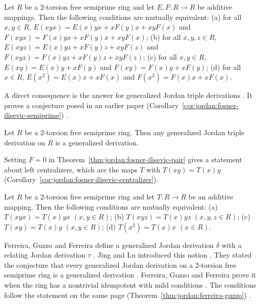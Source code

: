 \begin{theorem}\label{thm:jordan:fosner-ilisevic-pair}
Let $R$ be a $2$-torsion free semiprime ring and let $E,F\colon R\to R$ be additive mappings.
Then the following conditions are mutually equivalent:
(a) for all $x,y\in R$, $E(xyx)=E(x)yx+xF(y)x+xyF(x)$ and $F(xyx)=F(x)yx+xF(y)x+xyF(x)$;
(b) for all $x,y,z\in R$, $E(xyz)=E(x)yz+xF(y)z+xyF(z)$ and $F(xyz)=F(x)yz+xF(y)z+xyF(z)$;
(c) for all $x,y\in R$, $E(xy)=E(x)y+xF(y)$ and $F(xy)=F(x)y+xF(y)$;
(d) for all $x\in R$, $E(x^{2})=E(x)x+xF(x)$ and $F(x^{2})=F(x)x+xF(x)$.
\end{theorem}

A direct consequence is the answer for generalized Jordan triple derivations
\cite[p.~424]{FosnerIlisevic2008}. It proves a conjecture posed in an earlier paper (Corollary~\ref{cor:jordan:fosner-ilisevic-semiprime})
\cite[p.~424]{FosnerIlisevic2008}.\begin{corollary}\label{cor:jordan:fosner-ilisevic-semiprime}
Let $R$ be a $2$-torsion free semiprime ring. Then any generalized Jordan triple derivation on $R$
is a generalized derivation.
\end{corollary}

Setting $F=0$ in Theorem~\ref{thm:jordan:fosner-ilisevic-pair} gives a statement about left
centralizers, which are the maps $T$ with $T(xy)=T(x)y$ \cite[p.~424]{FosnerIlisevic2008} (Corollary~\ref{cor:jordan:fosner-ilisevic-centralizer}).

\begin{corollary}\label{cor:jordan:fosner-ilisevic-centralizer}
Let $R$ be a $2$-torsion free semiprime ring and let $T\colon R\to R$ be an additive mapping.
Then the following conditions are mutually equivalent:
(a) $T(xyx)=T(x)yx$ $(x,y\in R)$;
(b) $T(xyz)=T(x)yz$ $(x,y,z\in R)$;
(c) $T(xy)=T(x)y$ $(x,y\in R)$;
(d) $T(x^{2})=T(x)x$ $(x\in R)$.
\end{corollary}

Ferreira, Guzzo and Ferreira define a generalized Jordan derivation $\delta$ with a relating
Jordan derivation $\tau$ \cite[p.~1]{FerreiraGuzzoFerreira2020}. Jing and Lu introduced this
notion \cite[p.~2]{FerreiraGuzzoFerreira2020}. They stated the conjecture that every generalized Jordan
derivation on a $2$-torsion free semiprime ring is a generalized derivation
\cite[p.~2]{FerreiraGuzzoFerreira2020}. Ferreira, Guzzo and Ferreira prove it when the ring has a
nontrivial idempotent with mild conditions \cite[p.~2]{FerreiraGuzzoFerreira2020}. The conditions
follow the statement on the same page (Theorem~\ref{thm:jordan:ferreira-guzzo}) \cite[p.~2]{FerreiraGuzzoFerreira2020}.

